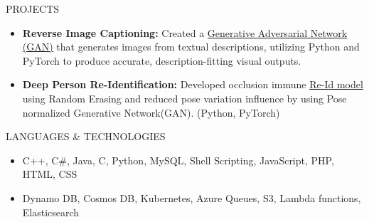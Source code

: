 \documentclass[]{mcdowellcv}
\begin{document}
 \begin{cvsection}{PROJECTS}
		\begin{cvsubsection}{}{}{}
			\begin{itemize}
    			\item \textbf{Reverse Image Captioning:} Created a  \href{https://github.com/aditya30394/Reverse-Image-Captioning}{Generative Adversarial Network (GAN)} that generates images from textual descriptions, utilizing Python and PyTorch to produce accurate, description-fitting visual outputs.
				\item \textbf{Deep Person Re-Identification:} Developed occlusion immune \href{https://github.com/aditya30394/Person-Re-Identification}{Re-Id model} using Random Erasing and reduced pose variation influence by using Pose normalized Generative Network(GAN). (Python, PyTorch)
			\end{itemize}
		\end{cvsubsection}
	\end{cvsection}
 
        \begin{cvsection}{LANGUAGES \& TECHNOLOGIES}
		\begin{cvsubsection}{}{}{}	
			\begin{itemize}
				\item C++, C\#, Java, C, Python, MySQL, Shell Scripting, JavaScript, PHP, HTML, CSS 
				\item Dynamo DB, Cosmos DB, Kubernetes, Azure Queues, S3, Lambda functions, Elasticsearch
			\end{itemize}
		\end{cvsubsection}
	\end{cvsection}
\end{document}
